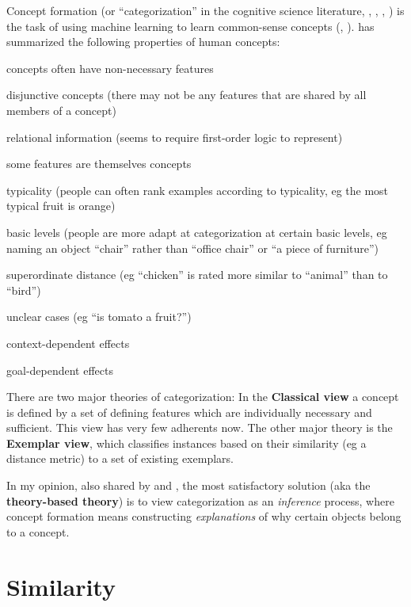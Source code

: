 Concept formation (or ``categorization'' in the cognitive science literature, \citep*{Murphy2002}, \citep*{Cohen2005}, \citep*{Margolis1999}, \citep*{Lakoff1987}) is the task of using machine learning to learn common-sense concepts (\citep*{Nakamura1993}, \citep*{Wrobel1994}).  \citep*{Wrobel1994} has summarized the following properties of human concepts:
\begin{compactenum-}
\item concepts often have non-necessary features
\item disjunctive concepts (there may not be any features that are shared by all members of a concept)
\item relational information (seems to require first-order logic to represent)
\item some features are themselves concepts
\item typicality (people can often rank examples according to typicality, eg the most typical fruit is orange)
\item basic levels (people are more adapt at categorization at certain basic levels, eg naming an object ``chair'' rather than ``office chair'' or ``a piece of furniture'')
\item superordinate distance (eg ``chicken'' is rated more similar to ``animal'' than to ``bird'')
\item unclear cases (eg ``is tomato a fruit?'')
\item context-dependent effects
\item goal-dependent effects
\end{compactenum-}

There are two major theories of categorization:  In the \textbf{Classical view} a concept is defined by a set of defining features which are individually necessary and sufficient.  This view has very few adherents now.  The other major theory is the \textbf{Exemplar view}, which classifies instances based on their similarity (eg a distance metric) to a set of existing exemplars.

In my opinion, also shared by \citep*{Murphy1985} and \citep*{Wrobel1994}, the most satisfactory solution (aka the \textbf{theory-based theory}) is to view categorization as an \textit{inference} process, where concept formation means constructing \textit{explanations} of why certain objects belong to a concept.

\section{Similarity}
\label{sec:similarity}

